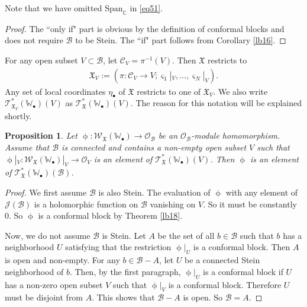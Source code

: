 \documentclass[12pt,a4paper,notitlepage]{article}
\theoremstyle{definition}
\theoremstyle{plain}
\newtheorem{pp}[df]{Proposition}
\newcommand{\fk}{\mathfrak}
\newcommand{\mc}{\mathcal}
\newcommand{\Span}{\mathrm{Span}}
\newcommand{\scr}{\mathscr}
\newcommand{\sgm}{\varsigma}
\newcommand{\blt}{\bullet}
\newcommand{\Wbb}{\mathbb W}
\newcommand{\Cbb}{\mathbb C}
\numberwithin{equation}{section}
\begin{document}
Note that we have omitted $\Span_\Cbb$ in \eqref{eq51}.

\begin{proof}
The ``only if" part is obvious by the definition of conformal blocks and does not require $\mc B$ to be Stein. The ``if" part follows from Corollary \ref{lb16}.
\end{proof}




For any open subset $V\subset\mc B$, let $\mc C_V=\pi^{-1}(V)$. \index{CVXV@$\mc C_V,\fk X_V$} Then $\fk X$ restricts to
\begin{align*}
\fk X_V:=(\pi:\mc C_V\rightarrow V;\sgm_1|_V,\dots,\sgm_N|_V).
\end{align*}
Any set of local coordinates $\eta_\blt$ of $\fk X$ restricts to one of $\fk X_V$.  We also write $\scr T_{\fk X_V}^*(\Wbb_\blt)(V)$ as $\scr T_{\fk X}^*(\Wbb_\blt)(V)$. The reason for this notation will be explained shortly.





\begin{pp}\label{lb36}
Let $\upphi:\scr W_{\fk X}(\Wbb_\blt)\rightarrow\scr O_{\mc B}$ be an $\scr O_{\mc B}$-module homomorphism. Assume that $\mc B$ is connected and contains a non-empty open subset $V$ such that $\upphi|_V:\scr W_{\fk X}(\Wbb_\blt)|_V\rightarrow\scr O_V$ is an element of $\scr T_{\fk X}^*(\Wbb_\blt)(V)$. Then $\upphi$ is an element of $\scr T_{\fk X}^*(\Wbb_\blt)(\mc B)$.
\end{pp}

\begin{proof}
We first assume $\mc B$ is also Stein. The evaluation of $\upphi$ with any element of $\scr J(\mc B)$ is a holomorphic function on $\mc B$ vanishing on $V$. So it must be constantly $0$. So $\upphi$ is a conformal block by Theorem \ref{lb18}. 

Now, we do not assume $\mc B$ is Stein. Let $A$ be the set of all $b\in\mc B$ such that $b$ has a  neighborhood $U$ satisfying that the restriction $\upphi|_U$ is a conformal block. Then $A$ is open and  non-empty. For any $b\in\mc B-A$, let $U$ be a connected Stein neighborhood of $b$. Then, by the first paragraph, $\upphi|_U$ is a conformal block if $U$ has a non-zero open subset $V$ such that $\upphi|_V$ is a conformal block. Therefore $U$ must be disjoint from $A$. This shows that $\mc B-A$ is open. So $\mc B=A$.
\end{proof}
\end{document}
